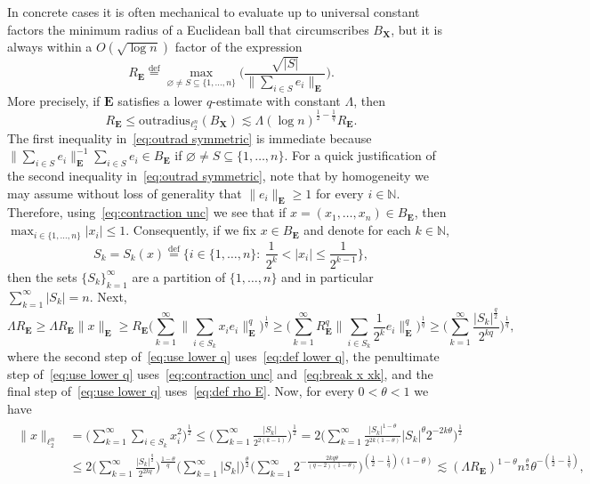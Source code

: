 \documentclass[11pt,reqno]{amsart}
\renewcommand{\le}{\leqslant}
\renewcommand{\ge}{\geqslant}
\newcommand{\n}{\{1,\ldots,n\}}
\newcommand{\X}{\mathbf X}
\theoremstyle{remark}
\renewcommand{\subset}{\subseteq}
\newcommand{\N}{\mathbb N}
\newcommand{\eqdef}{\stackrel{\mathrm{def}}{=}}
\renewcommand{\emptyset}{\varnothing}
\renewcommand{\1}{\mathbf 1}
\newcommand{\bfE}{\mathbf{E}}
\begin{document}
In concrete cases it is often mechanical to evaluate up to universal constant factors the minimum radius of a Euclidean ball that circumscribes $B_\X$, but it is always within a $O(\sqrt{\log n})$  factor of the expression
\begin{equation}\label{eq:def rho E}
R_\bfE\eqdef \max_{\emptyset\neq S\subset \n}\bigg(\frac{\sqrt{|S|}}{\|\sum_{i\in S} e_i\|_\bfE}\bigg).
\end{equation}
More precisely, if $\bfE$ satisfies a lower $q$-estimate with constant $\Lambda$, then
\begin{equation}\label{eq:outrad symmetric}
R_\bfE\le \mathrm{outradius}_{\ell_2^n}(B_\X)\lesssim \Lambda (\log n)^{\frac{1}{2}-\frac{1}{q}}R_\bfE.
\end{equation}
The first inequality in~\eqref{eq:outrad symmetric} is immediate because $\|\sum_{i\in S} e_i\|_\bfE^{-1}\sum_{i\in S} e_i\in B_\bfE$  if $\emptyset\neq S\subset \n$. For a quick justification of the second inequality in~\eqref{eq:outrad symmetric}, note that by homogeneity we may assume without loss of generality that $\|e_i\|_\bfE\ge 1$ for every $i\in \N$. Therefore, using~\eqref{eq:contraction unc} we see that if $x=(x_1,\ldots,x_n)\in B_\bfE$, then $\max_{i\in \n} |x_i|\le 1$. Consequently, if we fix $x\in B_\bfE$ and denote for each $k\in \N$,
\begin{equation}\label{eq:break x xk}
S_k=S_k(x)\eqdef \Big\{i\in \n:\ \frac{1}{2^k}<|x_i|\le \frac{1}{2^{k-1}}\Big\},
\end{equation}
then the sets $\{S_k\}_{k=1}^\infty$ are a partition of $\n$ and in particular $\sum_{k=1}^\infty|S_k|=n$. Next,
\begin{equation}\label{eq:use lower q}
\Lambda R_\bfE\ge \Lambda R_\bfE\|x\|_\bfE \ge R_\bfE\bigg(\sum_{k=1}^\infty \Big\|\sum_{i\in S_k} x_i e_i\Big\|_\bfE^q\bigg)^{\frac{1}{q}}\ge \bigg(\sum_{k=1}^\infty R_\bfE^q\Big\|\sum_{i\in S_k} \frac{1}{2^k}e_i\Big\|_\bfE^q\bigg)^{\frac{1}{q}}\ge \bigg(\sum_{k=1}^\infty \frac{|S_k|^{\frac{q}{2}}}{2^{kq}}\bigg)^{\frac{1}{q}},
\end{equation}
where the second step of~\eqref{eq:use lower q} uses~\eqref{eq:def lower q}, the penultimate step of~\eqref{eq:use lower q} uses~\eqref{eq:contraction unc} and~\eqref{eq:break x xk}, and the final step of~\eqref{eq:use lower q} uses~\eqref{eq:def rho E}.  Now, for every $0<\theta<1$ we have
\begin{align}\label{eq:tri holder2}
\begin{split}
\|x\|_{\ell_2^n}&=\bigg(\sum_{k=1}^\infty \sum_{i\in S_k} x_i^2\bigg)^{\frac12}\le \bigg(\sum_{k=1}^\infty \frac{|S_k|}{2^{2(k-1)}}\bigg)^{\frac12}=2\bigg(\sum_{k=1}^\infty \frac{|S_k|^{1-\theta}}{2^{2k(1-\theta)}}|S_k|^\theta2^{-2k\theta}\bigg)^{\frac12}\\&\le 2\bigg(\sum_{k=1}^\infty \frac{|S_k|^{\frac{q}{2}}}{2^{2kq}}\bigg)^{\frac{1-\theta}{q}}\bigg(\sum_{k=1}^\infty |S_k|\bigg)^{\frac{\theta}{2}}\bigg(\sum_{k=1}^\infty 2^{-{\frac{2kq\theta}{(q-2)(1-\theta)}}}\bigg)^{\left(\frac12-\frac{1}{q}\right)(1-\theta)}\lesssim
 (\Lambda R_\bfE)^{1-\theta}n^{\frac{\theta}{2}}\theta^{-\left(\frac12-\frac{1}{q}\right)},
 \end{split}
\end{align}
\end{document}
